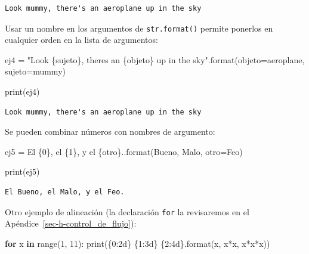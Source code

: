 \documentclass[
  spanish,
  letterpaper,
]{scrbook}
\newenvironment{Shaded}{\begin{snugshade}}{\end{snugshade}}
\newcommand{\BuiltInTok}[1]{\textcolor[rgb]{0.00,0.23,0.31}{#1}}
\newcommand{\ControlFlowTok}[1]{\textcolor[rgb]{0.00,0.23,0.31}{\textbf{#1}}}
\newcommand{\DecValTok}[1]{\textcolor[rgb]{0.68,0.00,0.00}{#1}}
\newcommand{\KeywordTok}[1]{\textcolor[rgb]{0.00,0.23,0.31}{\textbf{#1}}}
\newcommand{\NormalTok}[1]{\textcolor[rgb]{0.00,0.23,0.31}{#1}}
\newcommand{\OperatorTok}[1]{\textcolor[rgb]{0.37,0.37,0.37}{#1}}
\newcommand{\SpecialCharTok}[1]{\textcolor[rgb]{0.37,0.37,0.37}{#1}}
\newcommand{\StringTok}[1]{\textcolor[rgb]{0.13,0.47,0.30}{#1}}
\theoremstyle{definition}
\theoremstyle{remark}
\begin{document}
\begin{verbatim}
Look mummy, there's an aeroplane up in the sky
\end{verbatim}

Usar un nombre en los argumentos de \texttt{str.format()} permite
ponerlos en cualquier orden en la lista de argumentos:

\begin{Shaded}
\begin{Highlighting}[]
\NormalTok{ej4 }\OperatorTok{=} \StringTok{"Look }\SpecialCharTok{\{sujeto\}}\StringTok{, there\textquotesingle{}s an }\SpecialCharTok{\{objeto\}}\StringTok{ up in the sky"}\NormalTok{.}\BuiltInTok{format}\NormalTok{(objeto}\OperatorTok{=}\StringTok{\textquotesingle{}aeroplane\textquotesingle{}}\NormalTok{, sujeto}\OperatorTok{=}\StringTok{\textquotesingle{}mummy\textquotesingle{}}\NormalTok{)}

\BuiltInTok{print}\NormalTok{(ej4)}
\end{Highlighting}
\end{Shaded}

\begin{verbatim}
Look mummy, there's an aeroplane up in the sky
\end{verbatim}

Se pueden combinar números con nombres de argumento:

\begin{Shaded}
\begin{Highlighting}[]
\NormalTok{ej5 }\OperatorTok{=} \StringTok{\textquotesingle{}El }\SpecialCharTok{\{0\}}\StringTok{, el }\SpecialCharTok{\{1\}}\StringTok{, y el }\SpecialCharTok{\{otro\}}\StringTok{.\textquotesingle{}}\NormalTok{.}\BuiltInTok{format}\NormalTok{(}\StringTok{\textquotesingle{}Bueno\textquotesingle{}}\NormalTok{, }\StringTok{\textquotesingle{}Malo\textquotesingle{}}\NormalTok{, otro}\OperatorTok{=}\StringTok{\textquotesingle{}Feo\textquotesingle{}}\NormalTok{)}

\BuiltInTok{print}\NormalTok{(ej5)}
\end{Highlighting}
\end{Shaded}

\begin{verbatim}
El Bueno, el Malo, y el Feo.
\end{verbatim}

Otro ejemplo de alineación (la declaración \texttt{for} la revisaremos
en el Apéndice~\ref{sec-h-control_de_flujo}):

\begin{Shaded}
\begin{Highlighting}[]
\ControlFlowTok{for}\NormalTok{ x }\KeywordTok{in} \BuiltInTok{range}\NormalTok{(}\DecValTok{1}\NormalTok{, }\DecValTok{11}\NormalTok{):}
    \BuiltInTok{print}\NormalTok{(}\StringTok{\textquotesingle{}}\SpecialCharTok{\{0:2d\}}\StringTok{ }\SpecialCharTok{\{1:3d\}}\StringTok{ }\SpecialCharTok{\{2:4d\}}\StringTok{\textquotesingle{}}\NormalTok{.}\BuiltInTok{format}\NormalTok{(x, x}\OperatorTok{*}\NormalTok{x, x}\OperatorTok{*}\NormalTok{x}\OperatorTok{*}\NormalTok{x))}
\end{Highlighting}
\end{Shaded}
\end{document}
